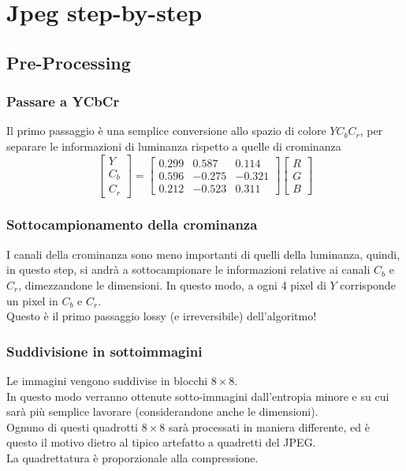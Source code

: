 \documentclass{report}
\begin{document}
	\newpage
	
	\section{Jpeg step-by-step}
	\subsection{Pre-Processing}
	\subsubsection{Passare a YCbCr}
	Il primo passaggio è una semplice conversione allo spazio di colore $YC_bC_r$, per separare le informazioni di luminanza rispetto a quelle di crominanza
	$$
	\begin{bmatrix}
		Y   \\
		C_b \\
		C_r 
	\end{bmatrix}
	=
	\begin{bmatrix}
		0.299 & 0.587  & 0.114  \\
		0.596 & -0.275 & -0.321 \\
		0.212 & -0.523 & 0.311  
	\end{bmatrix}
	\begin{bmatrix}
		R \\
		G \\
		B 
	\end{bmatrix}
	$$
	\subsubsection{Sottocampionamento della crominanza}
	I canali della crominanza sono meno importanti di quelli della luminanza, quindi, in questo step, si andrà a sottocampionare le informazioni relative ai canali $C_b$ e $C_r$, dimezzandone le dimensioni.
	In questo modo, a ogni 4 pixel di $Y$ corrisponde un pixel in $C_b$ e $C_r$.\\
	Questo è il primo passaggio lossy (e irreversibile) dell'algoritmo!
	
	\subsubsection{Suddivisione in sottoimmagini}
	Le immagini vengono suddivise in blocchi $8\times 8$.\\
	In questo modo verranno ottenute sotto-immagini dall'entropia minore e su cui sarà più semplice lavorare (considerandone anche le dimensioni).\\
	Ognuno di questi quadrotti $8\times 8$ sarà processati in maniera differente, ed è questo il motivo dietro al tipico artefatto a quadretti del JPEG.\\
	La quadrettatura è proporzionale alla compressione.
	
\end{document}
